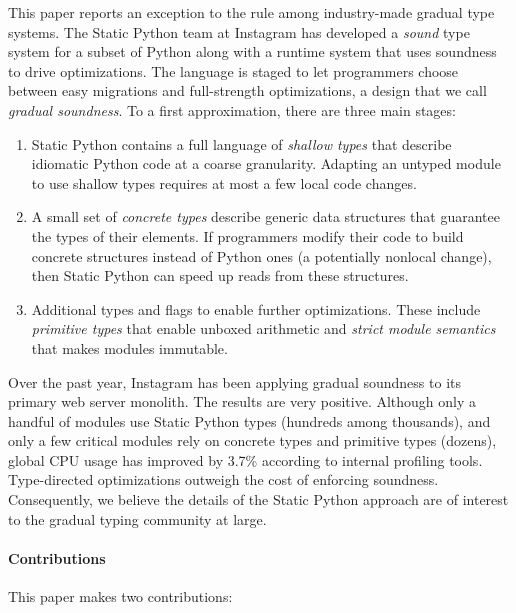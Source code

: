 \documentclass[english,cleveref,submission]{programming}
\newcommand{\SP}{Static Python}
\newcommand{\CPUchange}{3.7\%}
\begin{document}
This paper reports an exception to the rule among industry-made gradual type systems.
The \SP{} team at Instagram has developed a \emph{sound} type system for a subset of
Python along with a runtime system that uses soundness to drive optimizations.
The language is staged to let programmers choose between easy migrations and
full-strength optimizations, a design that we call \emph{gradual soundness}.
To a first approximation, there are three main stages:
\begin{enumerate}
  \item
    \SP{} contains a full language of \emph{shallow types}\/ that describe idiomatic
    Python code at a coarse granularity.
    Adapting an untyped module to use shallow types requires at most a few local code
    changes.
  \item
    A small set of \emph{concrete types}\/ describe generic data structures
    that guarantee the types of their elements.
    If programmers modify their code to build concrete structures instead of Python
    ones (a potentially nonlocal change), then \SP{} can speed up reads from these
    structures.
  \item
    Additional types and flags to enable further optimizations.
    These include \emph{primitive types}\/ that enable unboxed arithmetic
    and \emph{strict module semantics}\/ that makes modules immutable.
\end{enumerate}

Over the past year, Instagram has been applying gradual soundness to its
primary web server monolith.
The results are very positive.
Although only a handful of modules use \SP{} types (hundreds among thousands),
and only a few critical modules rely on concrete types and primitive types (dozens),
global CPU usage has improved by \CPUchange{} according to internal profiling tools.
Type-directed optimizations outweigh the cost of enforcing soundness.
Consequently, we believe the details of the \SP{} approach are of interest to
the gradual typing community at large.


\paragraph*{Contributions}
This paper makes two contributions:
\end{document}
